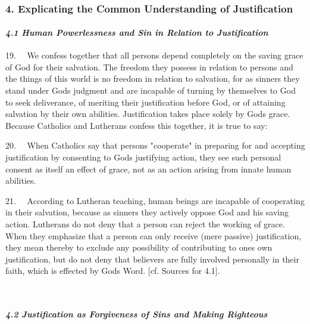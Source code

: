 ~

\subsubsection{4. Explicating the Common Understanding of
Justification}\label{explicating-the-common-understanding-of-justification}

\paragraph{\texorpdfstring{\emph{4.1 Human Powerlessness and Sin in
Relation to
Justification}}{4.1 Human Powerlessness and Sin in Relation to Justification}}\label{human-powerlessness-and-sin-in-relation-to-justification}

19.~ ~We confess together that all persons depend completely on the
saving grace of God for their salvation. The freedom they possess in
relation to persons and the things of this world is no freedom in
relation to salvation, for as sinners they stand under
God\textquotesingle s judgment and are incapable of turning by
themselves to God to seek deliverance, of meriting their justification
before God, or of attaining salvation by their own abilities.
Justification takes place solely by God\textquotesingle s grace. Because
Catholics and Lutherans confess this together, it is true to say:

20.~ ~When Catholics say that persons "cooperate" in preparing for and
accepting justification by consenting to God\textquotesingle s
justifying action, they see such personal consent as itself an effect of
grace, not as an action arising from innate human abilities.

21.~ ~According to Lutheran teaching, human beings are incapable of
cooperating in their salvation, because as sinners they actively oppose
God and his saving action. Lutherans do not deny that a person can
reject the working of grace. When they emphasize that a person can only
receive (mere passive) justification, they mean thereby to exclude any
possibility of contributing to one\textquotesingle s own justification,
but do not deny that believers are fully involved personally in their
faith, which is effected by God\textquotesingle s Word. {[}cf. Sources
for 4.1{]}.

~

\paragraph{\texorpdfstring{\emph{4.2 Justification as Forgiveness of
Sins and Making
Righteous}}{4.2 Justification as Forgiveness of Sins and Making Righteous}}\label{justification-as-forgiveness-of-sins-and-making-righteous}

